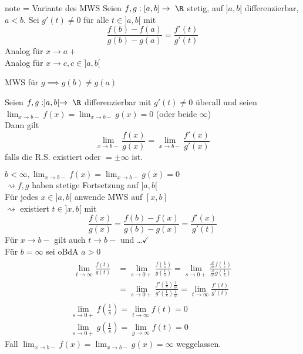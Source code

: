 \begin{satz*}{note = Variante des MWS}
	Seien $f, g: [a,b] \rightarrow \R$ stetig, auf $]a,b[$ differenzierbar, $a < b$. Sei $g'(t) \neq 0$ für alle $t \in ]a,b[$ mit
	\[ \frac{f(b)-f(a)}{g(b)-g(a)} = \frac{f'(t)}{g'(t)} \]
	Analog für $x \rightarrow a+$ \\
	Analog für $x \rightarrow c, c \in ]a,b[$ \\
	\begin{bem}
		MWS für $g \implies g(b) \neq g(a)$
	\end{bem}
\end{satz*}
\begin{satz*}[note = Regel von Bernoulli-de l'Hôpital , index = {Bernoulli-de l'Hôpital!Regel von}]
	Seien $f, g : ]a,b[ \rightarrow \R$ differenzierbar mit $g'(t) \neq 0$ überall und seien $\lim_{x \rightarrow b-} f(x) = \lim_{x \rightarrow b-} g(x) = 0$ (oder beide $\infty$) \\
	Dann gilt
	\[ \lim_{x \rightarrow b-} \frac{f(x)}{g(x)} = \lim_{x \rightarrow b-} \frac{f'(x)}{g'(x)} \]
	falls die R.S. existiert oder $=\pm \infty$ ist. \\
	\begin{bew}
		$b < \infty , \lim_{x \rightarrow b-} f(x) = \lim_{x \rightarrow b-} g(x) = 0$ \\
		$\rightsquigarrow f, g$ haben stetige Fortsetzung auf $]a,b[$ \\
		Für jedes $x\in ]a,b[$ anwende MWS auf $[x,b]$ \\
		$\rightsquigarrow$ existiert $t \in ]x,b[$ mit \\
		\[ \frac{f(x)}{g(x)} = \frac{f(b)-f(x)}{g(b)-g(x)} = \frac{f'(x)}{g'(t)} \]
		Für $x \rightarrow b-$ gilt auch $t \rightarrow b-$ und \dots $\checkmark$ \\
		Für $b=\infty$ sei oBdA $a > 0$
		\begin{gather*}
			\begin{split}
			\lim_{t \rightarrow \infty} \frac{f(t)}{g(t)}	&= \lim_{s \rightarrow 0+} \frac{f\left(\frac{1}{s}\right)}{g\left(\frac{1}{s}\right)} = \lim_{s \rightarrow 0+} \frac{\frac{\dd}{\dd s} f\left(\frac{1}{s}\right)}{\frac{\dd}{\dd s} g\left(\frac{1}{s}\right)} \\
											&= \lim_{s \rightarrow 0+} \frac{f'\left(\frac{1}{s}\right) \frac{1}{s^2}}{g'\left(\frac{1}{s}\right) \frac{1}{s^2}} = \lim_{t \rightarrow \infty} \frac{f'(t)}{g'(t)}
			\end{split}\\
			\lim_{s \rightarrow 0+} f\left(\frac{1}{s}\right) = \lim_{t \rightarrow \infty} f(t) = 0 \\
			\lim_{s \rightarrow 0+} g\left(\frac{1}{s}\right) = \lim_{g \rightarrow \infty} f(t) = 0 
		\end{gather*}
		Fall $\lim_{x \rightarrow b-} f(x) = \lim_{x \rightarrow b-} g(x) = \infty$ weggelassen.
	\end{bew}
\end{satz*}
